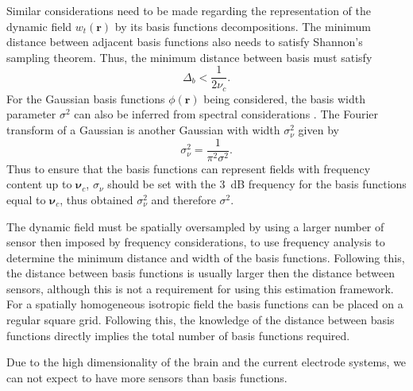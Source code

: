 \documentclass[12pt]{iopart}		%
\begin{document}
Similar considerations need to be made regarding the representation of the dynamic field $w_t(\mathbf{r})$ by its basis functions decompositions. The minimum distance between adjacent basis functions also needs to satisfy Shannon's sampling theorem. Thus, the minimum distance between basis must satisfy
\begin{equation}
\Delta_b < \frac{1}{2\nu_c}.
\end{equation}
For the Gaussian basis functions $\phi(\mathbf{r})$ being considered, the basis width parameter $\sigma^2$ can also be inferred from spectral considerations \cite{Sanner1992,Scerri2009}. The Fourier transform of a Gaussian is another Gaussian with width $\sigma^2_{\nu}$ given by
\begin{equation}
\sigma^2_{\nu} = \frac{1}{\pi^2\sigma^2}.
\end{equation}
Thus to ensure that the basis functions can represent fields with frequency content up to $\boldsymbol{\nu}_c$, $\sigma_{\nu}$ should be set with the 3~dB frequency for the basis functions equal to $\boldsymbol{\nu}_c$, thus obtained $\sigma^2_{\nu}$ and therefore $\sigma^2$.

The dynamic field must be spatially oversampled by using a larger number of sensor then imposed by frequency considerations, to use frequency analysis to determine the minimum distance and width of the basis functions. Following this, the distance between basis functions is usually larger then the distance between sensors, although this is not a requirement for using this estimation framework. For a spatially homogeneous isotropic field the basis functions can be placed on a regular square grid. Following this, the knowledge of the distance between basis functions directly implies the total number of basis functions required.

Due to the high dimensionality of the brain and the current electrode systems, we can not expect to have more sensors than basis functions.
\end{document}
